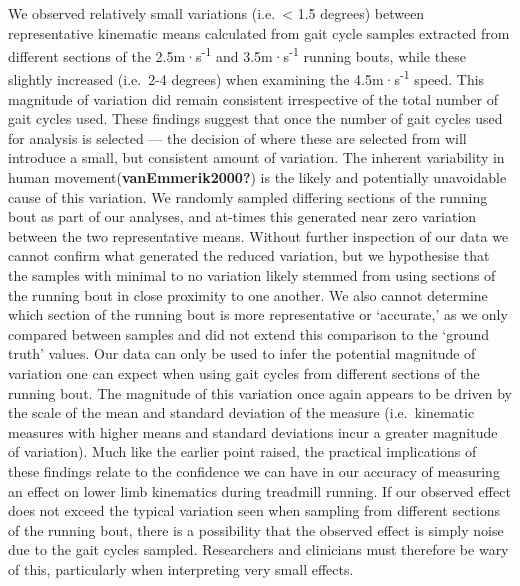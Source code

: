 \documentclass[]{elsarticle} %
\begin{document}
We observed relatively small variations (i.e.~\textless{} 1.5 degrees)
between representative kinematic means calculated from gait cycle
samples extracted from different sections of the
2.5m·s\textsuperscript{-1} and 3.5m·s\textsuperscript{-1} running bouts,
while these slightly increased (i.e.~2-4 degrees) when examining the
4.5m·s\textsuperscript{-1} speed. This magnitude of variation did remain
consistent irrespective of the total number of gait cycles used. These
findings suggest that once the number of gait cycles used for analysis
is selected --- the decision of where these are selected from will
introduce a small, but consistent amount of variation. The inherent
variability in human movement(\textbf{vanEmmerik2000?}) is the likely
and potentially unavoidable cause of this variation. We randomly sampled
differing sections of the running bout as part of our analyses, and
at-times this generated near zero variation between the two
representative means. Without further inspection of our data we cannot
confirm what generated the reduced variation, but we hypothesise that
the samples with minimal to no variation likely stemmed from using
sections of the running bout in close proximity to one another. We also
cannot determine which section of the running bout is more
representative or `accurate,' as we only compared between samples and
did not extend this comparison to the `ground truth' values. Our data
can only be used to infer the potential magnitude of variation one can
expect when using gait cycles from different sections of the running
bout. The magnitude of this variation once again appears to be driven by
the scale of the mean and standard deviation of the measure
(i.e.~kinematic measures with higher means and standard deviations incur
a greater magnitude of variation). Much like the earlier point raised,
the practical implications of these findings relate to the confidence we
can have in our accuracy of measuring an effect on lower limb kinematics
during treadmill running. If our observed effect does not exceed the
typical variation seen when sampling from different sections of the
running bout, there is a possibility that the observed effect is simply
noise due to the gait cycles sampled. Researchers and clinicians must
therefore be wary of this, particularly when interpreting very small
effects.

~
\end{document}
